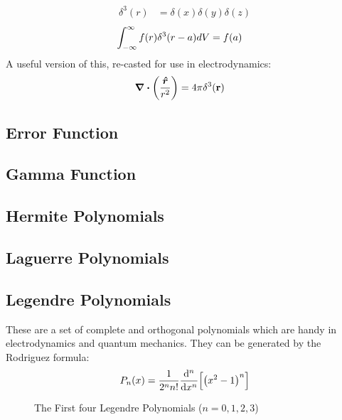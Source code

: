             \begin{align*}
                {\delta}^3(r) &= \delta(x) \delta(y) \delta(z)
            \end{align*}
            \begin{align*}
                \int_{-\infty}^{\infty} f(r) {\delta}^3(r-a) dV &= f(a)
            \end{align*}
            A useful version of this, re-casted for use in electrodynamics:
            \begin{align*}
                \div\qty(\frac{\e{r}}{{r}^2}) &= 4 \pi {\delta}^3(\vb{r})
            \end{align*}\newpage
    \subsection{Error Function}
    \subsection{Gamma Function}
    \subsection{Hermite Polynomials}
    \subsection{Laguerre Polynomials}
    \subsection{Legendre Polynomials}
        These are a set of complete and orthogonal polynomials which are handy in electrodynamics and quantum mechanics. 
        They can be generated by the Rodriguez formula\cite{pinsky_2011}:
        \begin{equation}
            P_n(x)=\oo{2^nn!}\der[n]{x}\qty[\qty(x^2-1)^n]
        \end{equation}
        \begin{figure}[h!]
            \centering
            \caption{The First four Legendre Polynomials ($n=0,1,2,3$)}
            \label{fig:legendre_graph}
        \end{figure}
%